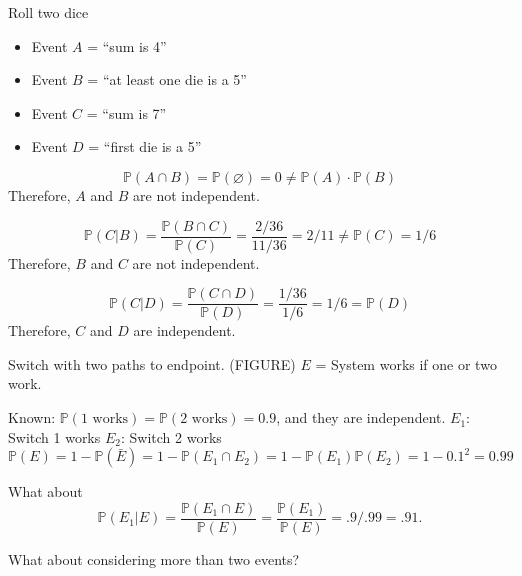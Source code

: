 \documentclass[main.tex]{subfiles}
\begin{document}
\begin{exmp}
    Roll two dice
    \begin{itemize}
        \item Event $A$ = ``sum is 4''
        \item Event $B$ = ``at least one die is a 5''
        \item Event $C$ = ``sum is 7''
        \item Event $D$ = ``first die is a 5''
    \end{itemize}

    $$\mathbb{P}(A\cap B) = \mathbb{P}(\varnothing) = 0 \neq \mathbb{P}(A)\cdot \mathbb{P}(B)$$
    Therefore, $A$ and $B$ are not independent.

    $$\mathbb{P}(C | B) = \frac{\mathbb{P}(B \cap C)}{\mathbb{P}(C)} = \frac{2/36}{11/36} = 2/11 \neq \mathbb{P}(C) = 1/6$$
    Therefore, $B$ and $C$ are not independent.

    $$\mathbb{P}(C | D) = \frac{\mathbb{P}(C \cap D)}{\mathbb{P}(D)} = \frac{1/36}{1/6} = 1/6 = \mathbb{P}(D)$$
    Therefore, $C$ and $D$ are independent.

\end{exmp}

\begin{exmp}
    Switch with two paths to endpoint. (FIGURE)
    $E$ = System works if one or two work.

    Known: $\mathbb{P}(1\textrm{ works}) = \mathbb{P}(2\textrm{ works}) = 0.9$, and they are independent.
    $E_1$: Switch 1 works
    $E_2$: Switch 2 works
    $$\mathbb{P}(E) = 1 - \mathbb{P}(\bar{E}) = 1 - \mathbb{P}(E_1 \cap E_2) = 1 - \mathbb{P}(E_1)\mathbb{P}(E_2) = 1 - 0.1^2 = 0.99$$

    What about $$\mathbb{P}(E_1 | E) = \frac{\mathbb{P}(E_1 \cap E)}{\mathbb{P}(E)} = \frac{\mathbb{P}(E_1)}{\mathbb{P}(E)} = .9/.99 = .91.$$
\end{exmp}

What about considering more than two events?
\end{document}
